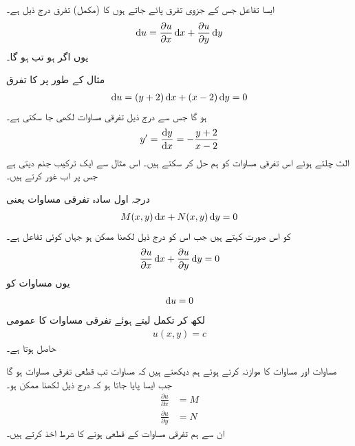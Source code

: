 ایسا تفاعل  جس کے  جزوی تفرق پائے جاتے ہوں کا (مکمل) تفرق درج ذیل ہے۔
\begin{align}
\dif u=\frac{\partial u}{\partial x}\dif x+\frac{\partial u}{\partial y}\dif y
\end{align}
یوں اگر  ہو تب  ہو گا۔

مثال کے طور پر  کا تفرق
\begin{align*}
\dif u=(y+2)\dif x+(x-2)\dif y=0
\end{align*}
ہو گا جس سے درج ذیل تفرقی مساوات لکھی جا سکتی ہے۔
\begin{align*}
y'=\frac{\dif y}{\dif x}=-\frac{y+2}{x-2}
\end{align*}
الٹ چلتے ہوئے اس تفرقی مساوات کو ہم حل کر سکتے ہیں۔ اس مثال سے ایک ترکیب جنم دیتی ہے جس پر اب غور کرتے ہیں۔

درجہ اول سادہ تفرقی مساوات  یعنی
\begin{align}\label{مساوات_سادہ_اول_قطعی_الف}
M(x,y)\dif x+N(x,y)\dif y=0
\end{align}
کو اس صورت  کہتے ہیں جب اس کو درج ذیل لکھنا ممکن ہو جہاں  کوئی تفاعل ہے۔
\begin{align}\label{مساوات_سادہ_اول_قطعی_ب}
\frac{\partial u}{\partial x}\dif x+\frac{\partial u}{\partial y}\dif y=0
\end{align}
یوں مساوات  کو
\begin{align}
\dif u=0
\end{align}
لکھ کر تکمل لیتے ہوئے تفرقی مساوات کا عمومی 
\begin{align}
u(x,y)=c
\end{align}
حاصل ہوتا ہے۔

مساوات  اور مساوات  کا موازنہ کرتے ہوئے ہم دیکھتے ہیں کہ مساوات  تب قطعی تفرقی مساوات ہو گا جب ایسا  پایا جاتا ہو کہ درج ذیل لکھنا ممکن ہو۔
\begin{align}
\frac{\partial u}{\partial x}&=M \label{مساوات_سادہ_اول_قطعی_شرط_الف}\\
\frac{\partial u}{\partial y}&=N\label{مساوات_سادہ_اول_قطعی_شرط_ب}
\end{align}
ان سے ہم تفرقی مساوات کے قطعی ہونے کا شرط اخذ کرتے ہیں۔

